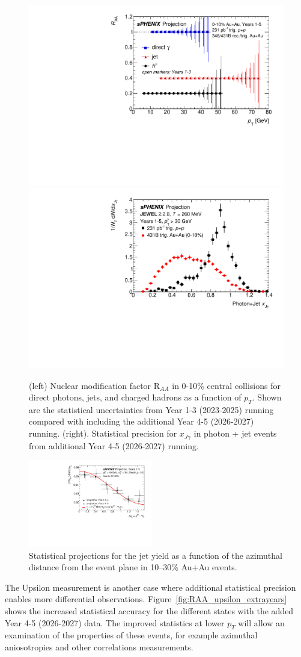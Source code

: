 \begin{figure}
    \centering
    \includegraphics[width=0.48\linewidth]{figs/RAA_jet_2}
    \includegraphics[width=0.48\linewidth]{figs/xJg_2}
    \caption{(left) Nuclear modification factor R$_{AA}$ in 0-10\% central \auau collisions for direct photons, jets, and charged hadrons as a function of $p_T$.   Shown are the statistical uncertainties from Year 1-3 (2023-2025) running compared with including the additional Year 4-5 (2026-2027) running.   (right). Statistical precision for $x_{J\gamma}$ in photon + jet events from additional Year 4-5 (2026-2027) running.}
    \label{fig:RAA_jet_extrayears}
\end{figure}

\begin{figure}[h]
\centering
\includegraphics[width=0.48\textwidth]{figs/jet_dphi_2}
\caption{Statistical projections for the jet yield as a function of the azimuthal distance from the event plane in 10--30\% Au+Au events.}
\label{fig:jet_dphi_proj2}
\end{figure}

The Upsilon measurement is another case where additional statistical precision enables more differential observations.   Figure~\ref{fig:RAA_upsilon_extrayears} shows the increased statistical accuracy for the different states with the added Year 4-5 (2026-2027) data.     The improved statistics at lower $p_T$ will allow an examination of the properties of these events, for example azimuthal aniosotropies and other correlations measurements.

